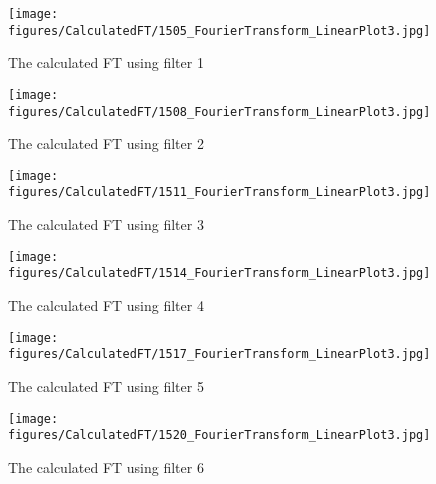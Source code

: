 \begin{figure}[H]
    \centering
    \begin{minipage}{0.45\textwidth}
        \centering
        \texttt{[image: figures/CalculatedFT/1505\_FourierTransform\_LinearPlot3.jpg]}
        \caption{The calculated FT using filter 1}
    \end{minipage}%
    \begin{minipage}{0.45\textwidth}
        \centering
        \texttt{[image: figures/CalculatedFT/1508\_FourierTransform\_LinearPlot3.jpg]}
        \caption{The calculated FT using filter 2}
    \end{minipage}%
    \vspace{2cm}
    \begin{minipage}{0.45\textwidth}
        \centering
        \texttt{[image: figures/CalculatedFT/1511\_FourierTransform\_LinearPlot3.jpg]}
        \caption{The calculated FT using filter 3}
    \end{minipage}%
    \begin{minipage}{0.45\textwidth}
        \centering
        \texttt{[image: figures/CalculatedFT/1514\_FourierTransform\_LinearPlot3.jpg]}
        \caption{The calculated FT using filter 4}
    \end{minipage}%
    \vspace{2cm}
    \begin{minipage}{0.45\textwidth}
        \centering
        \texttt{[image: figures/CalculatedFT/1517\_FourierTransform\_LinearPlot3.jpg]}
        \caption{The calculated FT using filter 5}
    \end{minipage}%
    \begin{minipage}{0.45\textwidth}
        \centering
        \texttt{[image: figures/CalculatedFT/1520\_FourierTransform\_LinearPlot3.jpg]}
        \caption{The calculated FT using filter 6}
    \end{minipage}%
\end{figure}